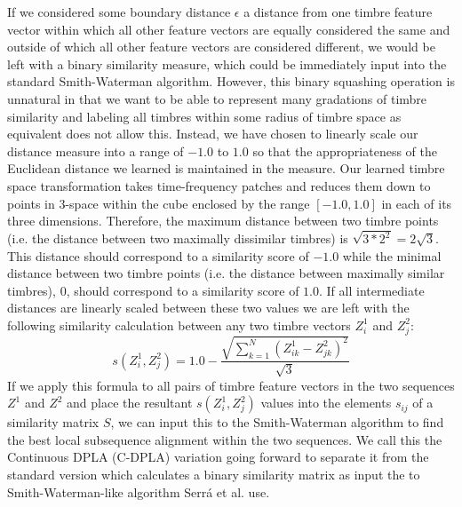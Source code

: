 \documentclass[a4paper,12pt]{report} 	%
\numberwithin{figure}{chapter}
\numberwithin{table}{chapter}
\numberwithin{equation}{chapter}
\begin{document}
\begin{flushleft}
If we considered some boundary distance $\epsilon$ a distance from one timbre feature vector within which all other feature vectors are equally considered the same and outside of which all other feature vectors are considered different, we would be left with a binary similarity measure, which could be immediately input into the standard Smith-Waterman algorithm. However, this binary squashing operation is unnatural in that we want to be able to represent many gradations of timbre similarity and labeling all timbres within some radius of timbre space as equivalent does not allow this. Instead, we have chosen to linearly scale our distance measure into a range of $-1.0$ to $1.0$ so that the appropriateness of the Euclidean distance we learned is maintained in the measure. Our learned timbre space transformation takes time-frequency patches and reduces them down to points in 3-space within the cube enclosed by the range $[-1.0,1.0]$ in each of its three dimensions. Therefore, the maximum distance between two timbre points (i.e. the distance between two maximally dissimilar timbres) is $\sqrt{3*2^2} = 2\sqrt{3}$. This distance should correspond to a similarity score of $-1.0$ while the minimal distance between two timbre points (i.e. the distance between maximally similar timbres), $0$, should correspond to a similarity score of $1.0$. If all intermediate distances are linearly scaled between these two values we are left with the following similarity calculation between any two timbre vectors $Z_i^1$ and $Z_j^2$:
\begin{equation}
s(Z_i^1, Z_j^2) = 1.0-\frac{\sqrt{\sum_{k=1}^{N}(Z_{ik}^1 - Z_{jk}^2)^2}}{\sqrt{3}}
\end{equation}
If we apply this formula to all pairs of timbre feature vectors in the two sequences $Z^1$ and $Z^2$ and place the resultant $s(Z_i^1, Z_j^2)$ values into the elements $s_{ij}$ of a similarity matrix $S$, we can input this to the Smith-Waterman algorithm to find the best local subsequence alignment within the two sequences. We call this the Continuous DPLA (C-DPLA) variation going forward to separate it from the standard version which calculates a binary similarity matrix as input the to Smith-Waterman-like algorithm Serr\'a et al. use.


\end{flushleft}
\end{document}
